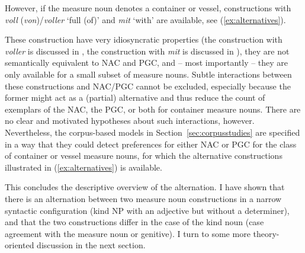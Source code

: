 \documentclass[USenglish]{article}
\begin{document}
However, if the measure noun denotes a container or vessel, constructions with \textit{voll} (\textit{von})\slash\textit{voller} `full (of)' and \textit{mit} `with' are available, see (\ref{ex:alternatives}).

\begin{exe}
  \ex\label{ex:alternatives}
  \begin{xlist}
  \end{xlist}
\end{exe}

These construction have very idiosyncratic properties (the construction with \textit{voller} is discussed in \citealp{Zeldes2018}, the construction with \textit{mit} is discussed in \citealp{Bhatt1990}), they are not semantically equivalent to NAC and PGC, and -- most importantly -- they are only available for a small subset of measure nouns.
Subtle interactions between these constructions and NAC\slash PGC cannot be excluded, especially because the former might act as a (partial) alternative and thus reduce the count of exemplars of the NAC, the PGC, or both for container measure nouns.
There are no clear and motivated hypotheses about such interactions, however.
Nevertheless, the corpus-based models in Section~\ref{sec:corpusstudies} are specified in a way that they could detect preferences for either NAC or PGC for the class of container or vessel measure nouns, for which the alternative constructions illustrated in (\ref{ex:alternatives}) is available.

This concludes the descriptive overview of the alternation.
I have shown that there is an alternation between two measure noun constructions in a narrow syntactic configuration (kind NP with an adjective but without a determiner), and that the two constructions differ in the case of the kind noun (case agreement with the measure noun or genitive).
I turn to some more theory-oriented discussion in the next section.
\end{document}
